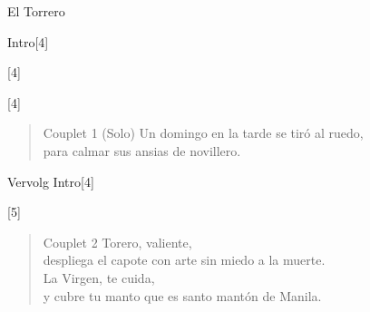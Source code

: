 \begin{song}{El Torrero}

\begin{instrumental}{Intro}[4]
 
\end{instrumental}
\begin{instrumental}{}[4]
 \measure{} \measure{} \measure{}
 \measure{}  \measure{}
 \measure{} \measure{} \measure{}
 \measure{} \measure{} \measure{}
\measure{} \measure{}  \measure{}
 \measure{} \measure*{}
\end{instrumental}
\begin{instrumental}{}[4]
 
 
\end{instrumental}

\begin{verse}{Couplet 1 \textnormal{(Solo)}}
 Un domingo en la tarde  se tiró al  ruedo,\\
para calmar sus ansias  de novillero.
\end{verse}

\begin{instrumental}{Vervolg Intro}[4]
 
 
\end{instrumental}
\begin{instrumental}{}[5]
 \measure{} \measure{}  
\end{instrumental}

\begin{verse}{Couplet 2}
Torero, valiente,\\
despliega el capote con arte sin miedo a la muerte.\\
La Virgen, te cuida,\\
y cubre tu manto que es santo mantón de Manila. 
\end{verse}


\end{song}
